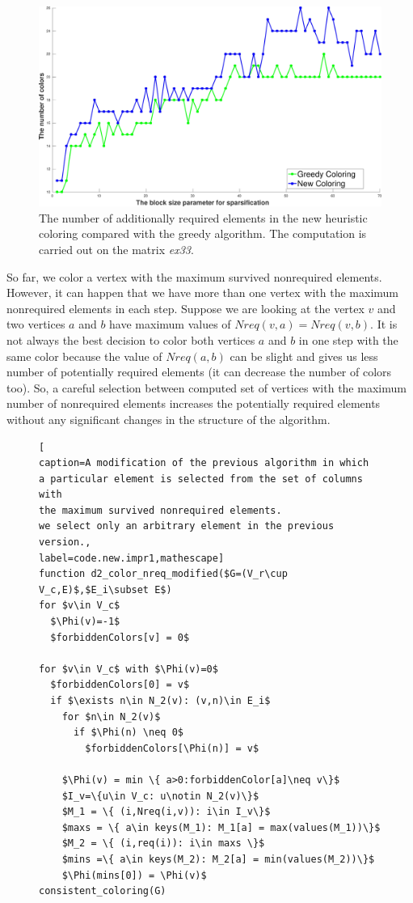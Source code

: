 \documentclass[12pt, twoside,a4paper,toc=bibliography]{scrbook}
\begin{document}
\begin{figure}
\centering
\includegraphics[width=0.9\linewidth]{bls_cols_ex33_without_alpha}
\caption{The number of additionally required elements in the new heuristic coloring compared with the greedy algorithm.
The computation is carried out on the matrix \textit{ex33}. }
\label{bls_cols_ex33_without_alpha}
\end{figure}
So far, we color a vertex with the maximum survived nonrequired elements.
However, it can happen
that we have more than one vertex with the maximum nonrequired elements in each step.
Suppose we are looking at the vertex $v$ and two vertices $a$ and $b$ have maximum values of
$Nreq(v,a) = Nreq(v,b)$.
It is not always the best decision
to color both vertices $a$ and $b$ in one step with the same color
because the value of $Nreq(a,b)$ can be slight and gives us less number
of potentially required elements (it can decrease the number of colors too).
So, a careful selection between computed set of vertices with the maximum number of
nonrequired elements increases the potentially required elements without
any significant changes in the structure of the algorithm.
\begin{figure}
\begin{lstlisting}[
caption=A modification of the previous algorithm in which
a particular element is selected from the set of columns with
the maximum survived nonrequired elements.
we select only an arbitrary element in the previous version.,
label=code.new.impr1,mathescape]
function d2_color_nreq_modified($G=(V_r\cup V_c,E)$,$E_i\subset E$)
for $v\in V_c$
  $\Phi(v)=-1$
  $forbiddenColors[v] = 0$

for $v\in V_c$ with $\Phi(v)=0$
  $forbiddenColors[0] = v$
  if $\exists n\in N_2(v): (v,n)\in E_i$
    for $n\in N_2(v)$
      if $\Phi(n) \neq 0$
        $forbiddenColors[\Phi(n)] = v$

    $\Phi(v) = min \{ a>0:forbiddenColor[a]\neq v\}$
    $I_v=\{u\in V_c: u\notin N_2(v)\}$
    $M_1 = \{ (i,Nreq(i,v)): i\in I_v\}$
    $maxs = \{ a\in keys(M_1): M_1[a] = max(values(M_1))\}$
    $M_2 = \{ (i,req(i)): i\in maxs \}$
    $mins =\{ a\in keys(M_2): M_2[a] = min(values(M_2))\}$
    $\Phi(mins[0]) = \Phi(v)$
consistent_coloring(G)
\end{lstlisting}
\end{figure}
\end{document}
